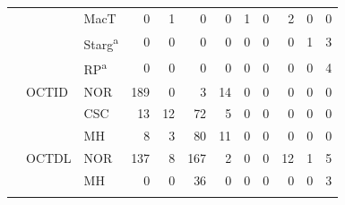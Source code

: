 \begin{tabular}{@{}lll*{9}{r}@{}}
 &  & MacT & 0 & 1 & 0 & 0 & 1 & 0 & 2 & 0 & 0 \\
 &  & Starg\textsuperscript{a} & 0 & 0 & 0 & 0 & 0 & 0 & 0 & 1 & 3 \\
 &  & RP\textsuperscript{a} & 0 & 0 & 0 & 0 & 0 & 0 & 0 & 0 & 4 \\
\addlinespace[1pt]
 & OCTID & NOR & 189 & 0 & 3 & 14 & 0 & 0 & 0 & 0 & 0 \\
 &  & CSC & 13 & 12 & 72 & 5 & 0 & 0 & 0 & 0 & 0 \\
 &  & MH & 8 & 3 & 80 & 11 & 0 & 0 & 0 & 0 & 0 \\
\addlinespace[1pt]
 & OCTDL & NOR & 137 & 8 & 167 & 2 & 0 & 0 & 12 & 1 & 5 \\
 &  & MH & 0 & 0 & 36 & 0 & 0 & 0 & 0 & 0 & 3 \\
\addlinespace[1pt]
\bottomrule
\end{tabular}
